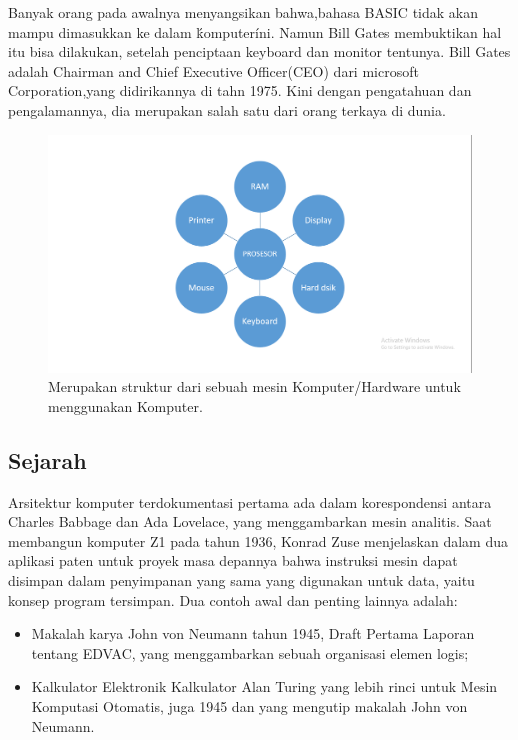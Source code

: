 	Banyak orang pada awalnya menyangsikan bahwa,bahasa BASIC tidak akan mampu dimasukkan ke dalam \'komputer\' ini. 
	Namun Bill Gates membuktikan hal itu bisa dilakukan, setelah penciptaan keyboard dan monitor tentunya. 
	Bill Gates adalah Chairman and Chief Executive Officer(CEO) dari microsoft Corporation,yang didirikannya di tahn 1975.
	Kini dengan pengatahuan dan pengalamannya, dia merupakan salah satu dari orang terkaya di dunia.\cite{syafrizal2005pengantar}
	\begin{figure}[ht]
		\centerline{\includegraphics[width=1\textwidth]{figures/komputermodern}}
		\caption{Merupakan struktur dari sebuah mesin Komputer/Hardware untuk menggunakan Komputer.}
		\label{komputermodern}
	\end{figure}
	
	\subsection{Sejarah}
Arsitektur komputer terdokumentasi pertama ada dalam korespondensi antara Charles Babbage dan Ada Lovelace, yang menggambarkan mesin analitis. Saat membangun komputer Z1 pada tahun 1936, Konrad Zuse menjelaskan dalam dua aplikasi paten untuk proyek masa depannya bahwa instruksi mesin dapat disimpan dalam penyimpanan yang sama yang digunakan untuk data, yaitu konsep program tersimpan. \cite{faberkonrad} Dua contoh awal dan penting lainnya adalah:
\begin{itemize}
\item Makalah karya John von Neumann tahun 1945, Draft Pertama Laporan tentang EDVAC, yang menggambarkan sebuah organisasi elemen logis; \cite{von1945first}
\item Kalkulator Elektronik Kalkulator Alan Turing yang lebih rinci untuk Mesin Komputasi Otomatis, juga 1945 dan yang mengutip makalah John von Neumann. \cite{copeland2005alan}
\end{itemize}

